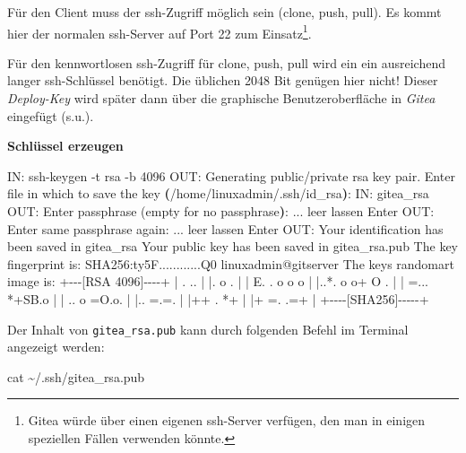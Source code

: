 \documentclass[
  letterpaper,
  DIV=11]{scrreprt}
\newenvironment{Shaded}{\begin{snugshade}}{\end{snugshade}}
\newcommand{\AttributeTok}[1]{\textcolor[rgb]{0.40,0.45,0.13}{#1}}
\newcommand{\BuiltInTok}[1]{\textcolor[rgb]{0.00,0.23,0.31}{#1}}
\newcommand{\ErrorTok}[1]{\textcolor[rgb]{0.68,0.00,0.00}{#1}}
\newcommand{\ExtensionTok}[1]{\textcolor[rgb]{0.00,0.23,0.31}{#1}}
\newcommand{\FunctionTok}[1]{\textcolor[rgb]{0.28,0.35,0.67}{#1}}
\newcommand{\KeywordTok}[1]{\textcolor[rgb]{0.00,0.23,0.31}{\textbf{#1}}}
\newcommand{\NormalTok}[1]{\textcolor[rgb]{0.00,0.23,0.31}{#1}}
\newcommand{\StringTok}[1]{\textcolor[rgb]{0.13,0.47,0.30}{#1}}
\begin{document}
Für den Client muss der ssh-Zugriff möglich sein (clone, push, pull). Es
kommt hier der normalen ssh-Server auf Port 22 zum Einsatz\footnote{Gitea
  würde über einen eigenen ssh-Server verfügen, den man in einigen
  speziellen Fällen verwenden könnte.}.

Für den kennwortlosen ssh-Zugriff für clone, push, pull wird ein ein
ausreichend langer ssh-Schlüssel benötigt. Die üblichen 2048 Bit genügen
hier nicht! Dieser \emph{Deploy-Key} wird später dann über die
graphische Benutzeroberfläche in \emph{Gitea} eingefügt (s.u.).

\textbf{Schlüssel erzeugen}

\begin{Shaded}
\begin{Highlighting}[]
\ExtensionTok{IN:}\NormalTok{  ssh{-}keygen }\AttributeTok{{-}t}\NormalTok{ rsa }\AttributeTok{{-}b}\NormalTok{ 4096}
\ExtensionTok{OUT:}\NormalTok{ Generating public/private rsa key pair.}
     \ExtensionTok{Enter}\NormalTok{ file in which to save the key }
     \KeywordTok{(}\ExtensionTok{/home/linuxadmin/.ssh/id\_rsa}\KeywordTok{)}\BuiltInTok{:}
\ExtensionTok{IN:}\NormalTok{  gitea\_rsa}
\ExtensionTok{OUT:}\NormalTok{ Enter passphrase }\ErrorTok{(}\ExtensionTok{empty}\NormalTok{ for no passphrase}\KeywordTok{)}\BuiltInTok{:}\NormalTok{ ... leer lassen Enter}
\ExtensionTok{OUT:}\NormalTok{ Enter same passphrase again: ... leer lassen Enter}
\ExtensionTok{OUT:}\NormalTok{ Your identification has been saved in gitea\_rsa}
     \ExtensionTok{Your}\NormalTok{ public key has been saved in gitea\_rsa.pub}
     \ExtensionTok{The}\NormalTok{ key fingerprint is:}
     \ExtensionTok{SHA256:ty5F............Q0}\NormalTok{ linuxadmin@gitserver}
     \ExtensionTok{The}\NormalTok{ key}\StringTok{\textquotesingle{}s randomart image is:}
\StringTok{     +{-}{-}{-}[RSA 4096]{-}{-}{-}{-}+}
\StringTok{     |      . ..       |}
\StringTok{     |.      o  .      |}
\StringTok{     | E. . o  o o     |}
\StringTok{     |..*. o o+ O .    |}
\StringTok{     | =... *+SB.o     |}
\StringTok{     | ..  o =O.o.     |}
\StringTok{     |..     =.=.      |}
\StringTok{     |++ .    *+       |}
\StringTok{     |+ =.    .=+      |}
\StringTok{     +{-}{-}{-}{-}[SHA256]{-}{-}{-}{-}{-}+}
\end{Highlighting}
\end{Shaded}

Der Inhalt von \texttt{gitea\_rsa.pub} kann durch folgenden Befehl im
Terminal angezeigt werden:

\begin{Shaded}
\begin{Highlighting}[]
\FunctionTok{cat}\NormalTok{ \textasciitilde{}/.ssh/gitea\_rsa.pub}
\end{Highlighting}
\end{Shaded}
\end{document}
